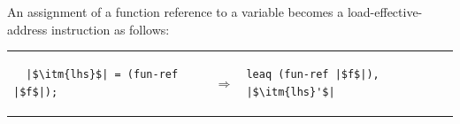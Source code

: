 \documentclass[11pt]{book}
\begin{document}
An assignment of a function reference to a variable becomes a
load-effective-address instruction as follows: \\
\begin{tabular}{lcl}
\begin{minipage}{0.35\textwidth}
\begin{lstlisting}
  |$\itm{lhs}$| = (fun-ref |$f$|);
\end{lstlisting}
\end{minipage}
&
$\Rightarrow$\qquad\qquad
&
\begin{minipage}{0.3\textwidth}
\begin{lstlisting}
leaq (fun-ref |$f$|), |$\itm{lhs}'$|
\end{lstlisting}
\end{minipage}
\end{tabular} \\
\end{document}
